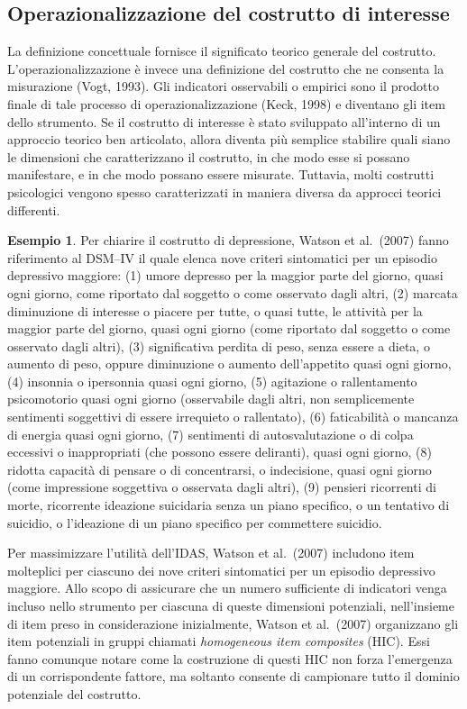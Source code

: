 \documentclass[
  11pt,
]{krantz}
\theoremstyle{definition}
\theoremstyle{definition}
\newtheorem{example}{Esempio}[chapter]
\theoremstyle{definition}
\theoremstyle{definition}
\theoremstyle{remark}
\begin{document}
\hypertarget{operazionalizzazione-del-costrutto-di-interesse}{%
\subsection{Operazionalizzazione del costrutto di interesse}\label{operazionalizzazione-del-costrutto-di-interesse}}

La definizione concettuale fornisce il significato teorico generale del costrutto. L'operazionalizzazione è invece una definizione del costrutto che ne consenta la misurazione (Vogt, 1993). Gli indicatori osservabili o empirici sono il prodotto finale di tale processo di operazionalizzazione (Keck, 1998) e diventano gli item dello strumento. Se il costrutto di interesse è stato sviluppato all'interno di un approccio teorico ben articolato, allora diventa più semplice stabilire quali siano le dimensioni che caratterizzano il costrutto, in che modo esse si possano manifestare, e in che modo possano essere misurate. Tuttavia, molti costrutti psicologici vengono spesso caratterizzati in maniera diversa da approcci teorici differenti.

\begin{example}
Per chiarire il costrutto di depressione, Watson et al.~(2007) fanno riferimento al DSM--IV il quale elenca nove criteri sintomatici per un episodio depressivo maggiore: (1) umore depresso per la maggior parte del giorno, quasi ogni giorno, come riportato dal soggetto o come osservato dagli altri, (2) marcata diminuzione di interesse o piacere per tutte, o quasi tutte, le attività per la maggior parte del giorno, quasi ogni giorno (come riportato dal soggetto o come osservato dagli altri), (3) significativa perdita di peso, senza essere a dieta, o aumento di peso, oppure diminuzione o aumento dell'appetito quasi ogni giorno, (4) insonnia o ipersonnia quasi ogni giorno, (5) agitazione o rallentamento psicomotorio quasi ogni giorno (osservabile dagli altri, non semplicemente sentimenti soggettivi di essere irrequieto o rallentato), (6) faticabilità o mancanza di energia quasi ogni giorno, (7) sentimenti di autosvalutazione o di colpa eccessivi o inappropriati (che possono essere deliranti), quasi ogni giorno, (8) ridotta capacità di pensare o di concentrarsi, o indecisione, quasi ogni giorno (come impressione soggettiva o osservata dagli altri), (9) pensieri ricorrenti di morte, ricorrente ideazione suicidaria senza un piano specifico, o un tentativo di suicidio, o l'ideazione di un piano specifico per commettere suicidio.

Per massimizzare l'utilità dell'IDAS, Watson et al.~(2007) includono item molteplici per ciascuno dei nove criteri sintomatici per un episodio depressivo maggiore. Allo scopo di assicurare che un numero sufficiente di indicatori venga incluso nello strumento per ciascuna di queste dimensioni potenziali, nell'insieme di item preso in considerazione inizialmente, Watson et al.~(2007) organizzano gli item potenziali in gruppi chiamati \emph{homogeneous item composites} (HIC). Essi fanno comunque notare come la costruzione di questi HIC non forza l'emergenza di un corrispondente fattore, ma soltanto consente di campionare tutto il dominio potenziale del costrutto.
\end{example}
\end{document}
